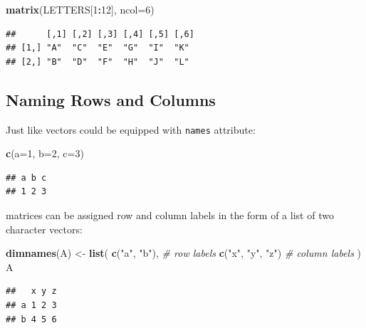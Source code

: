 \documentclass[10pt,b5paper,krantz1]{krantz}
\newenvironment{Shaded}{\begin{snugshade}}{\end{snugshade}}
\newcommand{\CommentTok}[1]{\textcolor[rgb]{0.37,0.37,0.37}{\textit{#1}}}
\newcommand{\DataTypeTok}[1]{\textcolor[rgb]{0.27,0.27,0.27}{#1}}
\newcommand{\DecValTok}[1]{\textcolor[rgb]{0.06,0.06,0.06}{#1}}
\newcommand{\KeywordTok}[1]{\textcolor[rgb]{0.27,0.27,0.27}{\textbf{#1}}}
\newcommand{\NormalTok}[1]{#1}
\newcommand{\OperatorTok}[1]{\textcolor[rgb]{0.43,0.43,0.43}{\textbf{#1}}}
\newcommand{\StringTok}[1]{\textcolor[rgb]{0.5,0.5,0.5}{#1}}
\begin{document}
\begin{Shaded}
\begin{Highlighting}[]
\KeywordTok{matrix}\NormalTok{(LETTERS[}\DecValTok{1}\OperatorTok{:}\DecValTok{12}\NormalTok{], }\DataTypeTok{ncol=}\DecValTok{6}\NormalTok{)}
\end{Highlighting}
\end{Shaded}

\begin{verbatim}
##      [,1] [,2] [,3] [,4] [,5] [,6]
## [1,] "A"  "C"  "E"  "G"  "I"  "K" 
## [2,] "B"  "D"  "F"  "H"  "J"  "L"
\end{verbatim}

\hypertarget{naming-rows-and-columns}{%
\subsection{Naming Rows and Columns}\label{naming-rows-and-columns}}

Just like vectors could be equipped with \texttt{names} attribute:

\begin{Shaded}
\begin{Highlighting}[]
\KeywordTok{c}\NormalTok{(}\DataTypeTok{a=}\DecValTok{1}\NormalTok{, }\DataTypeTok{b=}\DecValTok{2}\NormalTok{, }\DataTypeTok{c=}\DecValTok{3}\NormalTok{)}
\end{Highlighting}
\end{Shaded}

\begin{verbatim}
## a b c 
## 1 2 3
\end{verbatim}

matrices can be assigned row and column labels
in the form of a list of two character vectors:

\begin{Shaded}
\begin{Highlighting}[]
\KeywordTok{dimnames}\NormalTok{(A) <-}\StringTok{ }\KeywordTok{list}\NormalTok{(}
    \KeywordTok{c}\NormalTok{(}\StringTok{"a"}\NormalTok{, }\StringTok{"b"}\NormalTok{),     }\CommentTok{# row labels}
    \KeywordTok{c}\NormalTok{(}\StringTok{"x"}\NormalTok{, }\StringTok{"y"}\NormalTok{, }\StringTok{"z"}\NormalTok{) }\CommentTok{# column labels}
\NormalTok{)}
\NormalTok{A}
\end{Highlighting}
\end{Shaded}

\begin{verbatim}
##   x y z
## a 1 2 3
## b 4 5 6
\end{verbatim}
\end{document}
